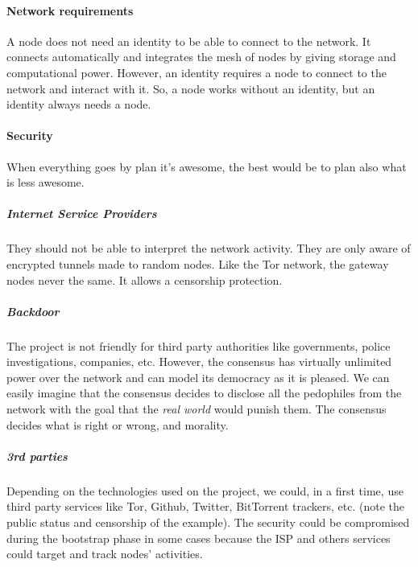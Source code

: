 \paragraph{Network requirements} A node does not need an identity to be able to connect to the network. It connects automatically and integrates the mesh of nodes by giving storage and computational power. However, an identity requires a node to connect to the network and interact with it. So, a node works without an identity, but an identity always needs a node.

\paragraph{Security} When everything goes by plan it's awesome, the best would be to plan also what is less awesome.

\subparagraph{Internet Service Providers} They should not be able to interpret the network activity. They are only aware of encrypted tunnels made to random nodes. Like the Tor network, the gateway nodes never the same. It allows a censorship protection.

\subparagraph{Backdoor} The project is not friendly for third party authorities like governments, police investigations, companies, etc. However, the consensus has virtually unlimited power over the network and can model its democracy as it is pleased. We can easily imagine that the consensus decides to disclose all the pedophiles from the network with the goal that the \textit{real world} would punish them. The consensus decides what is right or wrong, and morality.

\subparagraph{3rd parties} Depending on the technologies used on the project, we could, in a first time, use third party services like Tor, Github, Twitter, BitTorrent trackers, etc. (note the public status and censorship of the example). The security could be compromised during the bootstrap phase in some cases because the ISP and others services could target and track nodes' activities.


